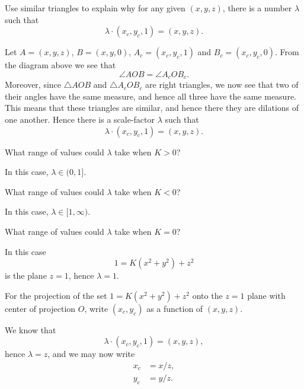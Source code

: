 \documentclass{ximera}
\begin{document}
\begin{problem}
  Use similar triangles to explain why for any given $(x,y,z)$, there
  is a number $\lambda$ such that
  \[
  \lambda\cdot(x_c,y_c,1) = (x,y,z).
  \]
  \begin{freeResponse}
    Let $A = (x,y,z)$, $B= (x,y,0)$, $A_c = (x_c,y_c,1)$ and
    $B_c=(x_c,y_c,0)$. From the diagram above we see that
    \[
    \angle AOB = \angle A_c O B_c.
    \]
    Moreover, since $\triangle AOB$ and $\triangle A_c O B_c$ are
    right triangles, we now see that two of their angles have the same
    measure, and hence all three have the same measure. This means
    that these triangles are similar, and hence there they are
    dilations of one another. Hence there is a scale-factor $\lambda$
    such that
    \[
    \lambda\cdot(x_c,y_c,1) = (x,y,z).
    \]
  \end{freeResponse}
\end{problem}


\begin{problem}
  What range of values could $\lambda$ take when $K>0$?
  \begin{freeResponse}
    In this case, $\lambda\in (0,1]$.
  \end{freeResponse}
\end{problem}

\begin{problem}
  What range of values could $\lambda$ take when $K<0$?
  \begin{freeResponse}
    In this case, $\lambda\in[1,\infty)$.
  \end{freeResponse}
\end{problem}

\begin{problem}
  What range of values could $\lambda$ take when $K=0$?
  \begin{freeResponse}
    In this case
    \[
    1=K\left(x^{2}+y^{2}\right)+z^{2} 
    \]
    is the plane $z = 1$, hence $\lambda=1$.
  \end{freeResponse}
\end{problem}



\begin{problem}
  For the projection of the set $1=K\left(x^{2}+y^{2}\right)+z^{2}$
  onto the $z=1$ plane with center of projection $O$, write
  $(x_{c},y_{c})$ as a function of $(x,y,z)$.
  \begin{freeResponse}
    We know that
    \[
    \lambda\cdot(x_{c},y_{c},1)=(x,y,z),
    \]
    hence $\lambda=z$, and we may now write
    \begin{align*}
      x_{c} &=x/z,\\
      y_{c} &=y/z.
    \end{align*}
  \end{freeResponse}
\end{problem}
\end{document}
